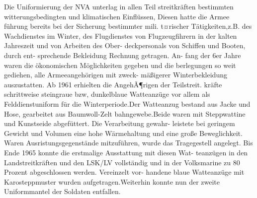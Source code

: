Die Uniformierung der NVA unterlag in allen Teil
streitkräften bestimmten witterungsbedingten und
klimatischen Einflüssen, Diesen hatte die Armee
führung bereits bei der Sicherung bestimmter mili.
t¤rischer Tätigkeiten,z.B. des Wachdienstes im
Winter, des Flugdienstes von Flugzeugfihrern in
der kalten Jahreszeit und von Arbeiten des Ober-
deckpersonals von Schiffen und Booten, durch ent-
sprechende Bekleidung Rechnung getragen. An-
fang der 6er Jahre waren die ökonomischen
Möglichkeiten gegeben und die berlegungen so
weit gediehen, alle Armeeangehörigen mit zweck-
mäßigerer Winterbekleidung auszustatten.
Ab 1961 erhielten die AngehÃ¶rigen der Teilstreit.
kräfte schrittweise steingraue bzw, dunkelblaue
Watteanzüge vor allem als Felddienstuniform für
die Winterperiode.Der Watteanzug bestand aus
Jacke und Hose, gearbeitet aus Baumwoll-Zelt
bahngewebe.Beide waren mit Steppwattine und
Kunstseide abgefüttert. Die Verarbeitung gewahr-
leistete bei geringem Gewicht und Volumen eine
hohe Wärmehaltung und eine große Beweglichkeit.
Waren Ausristungsgegenstände mitzuführen,
wurde das Tragegestell angelegt. Bis Ende 1965
konnte die erstmalige Ausstattung mit diesen Wat-
teanzügen in den Landstreitkräften und den
LSK/LV vollständig und in der Volksmarine zu
80 Prozent abgeschlossen werden. Vereinzelt vor-
handene blaue Watteanzüge mit Karosteppmuster
wurden aufgetragen.Weiterhin konnte nun der
zweite Uniformmantel der Soldaten entfallen.

